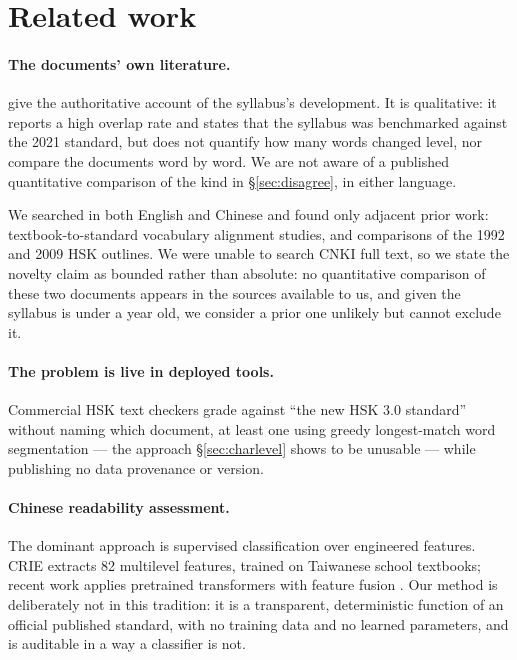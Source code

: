 \documentclass[11pt]{article}
\begin{document}
\section{Related work}

\paragraph{The documents' own literature.} \citet{feng2026hsk30} give the
authoritative account of the syllabus's development. It is qualitative: it
reports a high overlap rate and states that the syllabus was benchmarked
against the 2021 standard, but does not quantify how many words changed level,
nor compare the documents word by word. We are not aware of a published
quantitative comparison of the kind in \S\ref{sec:disagree}, in either
language.

We searched in both English and Chinese and found only adjacent prior work:
textbook-to-standard vocabulary alignment studies, and comparisons of the 1992
and 2009 HSK outlines. We were unable to search CNKI full text, so we state the
novelty claim as bounded rather than absolute: no quantitative comparison of
these two documents appears in the sources available to us, and given the
syllabus is under a year old, we consider a prior one unlikely but cannot
exclude it.

\paragraph{The problem is live in deployed tools.} Commercial HSK text checkers
grade against ``the new HSK 3.0 standard'' without naming which document, at
least one using greedy longest-match word segmentation --- the approach
\S\ref{sec:charlevel} shows to be unusable --- while publishing no data
provenance or version.

\paragraph{Chinese readability assessment.} The dominant approach is supervised
classification over engineered features. CRIE \citep{sung2016crie} extracts 82
multilevel features, trained on Taiwanese school textbooks; recent work applies
pretrained transformers with feature fusion \citep{yang2025chinese}. Our method
is deliberately not in this tradition: it is a transparent, deterministic
function of an official published standard, with no training data and no
learned parameters, and is auditable in a way a classifier is not.
\end{document}
